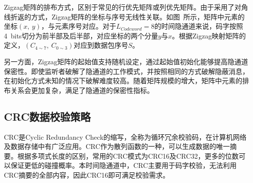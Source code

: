 
Zigzag矩阵的排布方式，区别于常见的行优先矩阵或列优先矩阵。由于采用了对角线折返的方式，Zigzag矩阵的坐标与序号无线性关联。如图\ 所示，矩阵中元素的坐标$(x,\ y)$，与元素序号对应。对于$L_{Codeword}=8$的时间隐通道来说，码字按照{4\ bits}切分为前半部及后半部，对应坐标的两个分量$y$与$x$。根据Zigzag映射矩阵的定义，$(C_{4\sim 7},\ C_{0\sim 3})$对应到数据包序号$S$。

另一方面，Zigzag矩阵的起始值支持随机设定，通过起始值初始化能够提高隐通道保密性。即使监听者破解了隐通道的工作模式，并按照相同的方式破解隐蔽消息，在初始化方式未知的情况下破解难度较高。随着矩阵规模的增大，矩阵中元素的排布关系会更加复杂，满足了隐通道的保密性指标。

\subsection{CRC数据校验策略}
\label{chap:zigzag:motivation:crc}

CRC是Cyclic Redundancy Check的缩写，全称为循环冗余校验码，在计算机网络及数据存储中有广泛应用。CRC作为散列函数的一种，可以生成数据的唯一摘要。根据多项式长度的区别，常用的CRC模式为CRC16及CRC32，更多的位数可以保证更低的碰撞概率。本时间隐通道中，CRC主要用于码字校验，无法利用CRC摘要的全部内容，因此CRC16即可满足校验需求。


